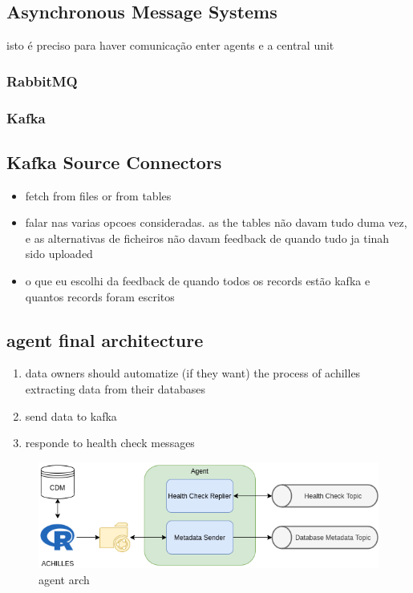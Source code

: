 \subsection{Asynchronous Message Systems}

isto é preciso para haver comunicação enter agents e a central unit

\subsubsection{RabbitMQ}

\subsubsection{Kafka}


\subsection{Kafka Source Connectors}
\begin{itemize}
    \item fetch from files or from tables
    \item falar nas varias opcoes consideradas. as the tables não davam tudo duma vez, e as alternativas de ficheiros não davam feedback de quando tudo ja tinah sido uploaded
    \item o que eu escolhi da feedback de quando todos os records estão kafka e quantos records foram escritos
\end{itemize}


\subsection{agent final architecture}
\begin{enumerate}
    \item data owners should automatize (if they want) the process of achilles extracting data from their databases
    \item send data to kafka
    \item responde to health check messages
\end{enumerate}

\begin{figure}
    \center
    \includegraphics[width=\textwidth]{agent-architecture}
    \caption{agent arch}
    \label{fig:agent-architecture}
\end{figure}

